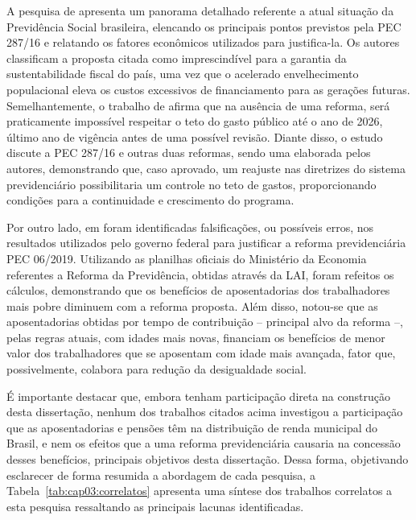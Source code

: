 A pesquisa de \cite{cap03_ref6} apresenta um panorama detalhado referente a atual situação da Previdência Social brasileira, elencando os principais pontos previstos pela PEC 287/16 e relatando os fatores econômicos utilizados para justifica-la. Os autores classificam a proposta citada como imprescindível para a garantia da sustentabilidade fiscal do país, uma vez que o acelerado envelhecimento populacional eleva os custos excessivos de financiamento para as gerações futuras. Semelhantemente, o trabalho de \cite{cap03_ref7} afirma que na ausência de uma reforma, será praticamente impossível respeitar o teto do gasto público até o ano de 2026, último ano de vigência antes de uma possível revisão. Diante disso, o estudo discute a PEC 287/16 e outras duas reformas, sendo uma elaborada pelos autores, demonstrando que, caso aprovado, um reajuste nas diretrizes do sistema previdenciário possibilitaria um controle no teto de gastos, proporcionando condições para a continuidade e crescimento do programa.

Por outro lado, em \cite{cap05_ref10} foram identificadas falsificações, ou possíveis erros, nos resultados utilizados pelo governo federal para justificar a reforma previdenciária PEC 06/2019. Utilizando as planilhas oficiais do Ministério da Economia referentes a Reforma da Previdência, obtidas através da LAI, foram refeitos os cálculos, demonstrando que os benefícios de aposentadorias dos trabalhadores mais pobre diminuem com a reforma proposta. Além disso, notou-se que as aposentadorias obtidas por tempo de contribuição – principal alvo da reforma –, pelas regras atuais, com idades mais novas, financiam os benefícios de menor valor dos trabalhadores que se aposentam com idade mais avançada, fator que, possivelmente, colabora para redução da desigualdade social.

É importante destacar que, embora tenham participação direta na construção desta dissertação, nenhum dos trabalhos citados acima investigou a participação que as aposentadorias e pensões têm na distribuição de renda municipal do Brasil, e nem os efeitos que a uma reforma previdenciária causaria na concessão desses benefícios, principais objetivos desta dissertação. Dessa forma, objetivando esclarecer de forma resumida a abordagem de cada pesquisa, a Tabela~\ref{tab:cap03:correlatos} apresenta uma síntese dos trabalhos correlatos a esta pesquisa ressaltando as principais lacunas identificadas.

